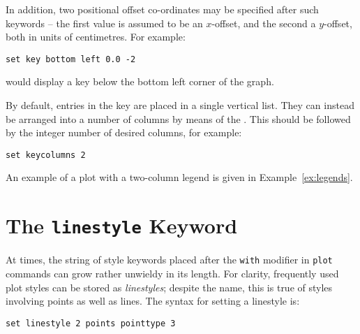In addition, two positional offset co-ordinates may be specified after such
keywords -- the first value is assumed to be an $x$-offset, and the second a
$y$-offset, both in units of centimetres. For example:

\begin{verbatim}
set key bottom left 0.0 -2
\end{verbatim}

\noindent would display a key below the bottom left corner of the graph.

By default, entries in the key are placed in a single vertical list. They can
instead be arranged into a number of columns by means of the . This should be followed by the integer number of desired columns,
for example:

\begin{verbatim}
set keycolumns 2
\end{verbatim}

\noindent An example of a plot with a two-column legend is given in
Example~\ref{ex:legends}.


\section{The {\tt linestyle} Keyword}

At times, the string of style keywords placed after the {\tt with} modifier
in {\tt plot} commands can grow rather unwieldy in its length. For clarity,
frequently used plot styles can be stored as {\it linestyles}; despite the name,
this is true of styles involving points as well as lines. The syntax for
setting a linestyle is:

\begin{verbatim}
set linestyle 2 points pointtype 3
\end{verbatim}

